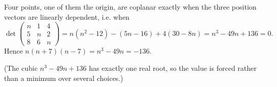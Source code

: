 Four points, one of them the origin, are coplanar exactly when the three position vectors are linearly dependent, i.e. when
\[\det\begin{pmatrix}n&1&4\\5&n&2\\8&6&n\end{pmatrix}=n(n^2-12)-(5n-16)+4(30-8n)=n^3-49n+136=0.\]
Hence $n(n+7)(n-7)=n^3-49n=\boxed{-136}$.

(The cubic $n^3-49n+136$ has exactly one real root, so the value is forced rather than a minimum over several choices.)
